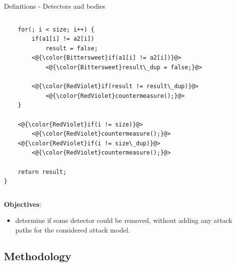 \begin{frame}[fragile]{Definitions - Detectors and bodies}
\begin{small}
\begin{columns}
\begin{column}{0.5\textwidth}
\begin{lstlisting}
    for(; i < size; i++) {
        if(a1[i] != a2[i])
            result = false;
        <@{\color{Bittersweet}if(a1[i] != a2[i])}@>
            <@{\color{Bittersweet}result\_dup = false;}@> 
        
        <@{\color{RedViolet}if(result != result\_dup)}@>
            <@{\color{RedViolet}countermeasure();}@>
    }

    <@{\color{RedViolet}if(i != size)}@>
        <@{\color{RedViolet}countermeasure();}@>
    <@{\color{RedViolet}if(i != size\_dup)}@>
        <@{\color{RedViolet}countermeasure();}@>

    return result;
}
                \end{lstlisting}
            \end{column}
        \end{columns}
        \vspace{0.1cm}
    
        \textbf{Objectives}: 
        \begin{itemize}
            \item determine if some {\color{RedViolet}detector} could be removed, without adding any attack paths for the considered attack model.
        \end{itemize}
    \end{small}
\end{frame}


\subsection{Methodology}

